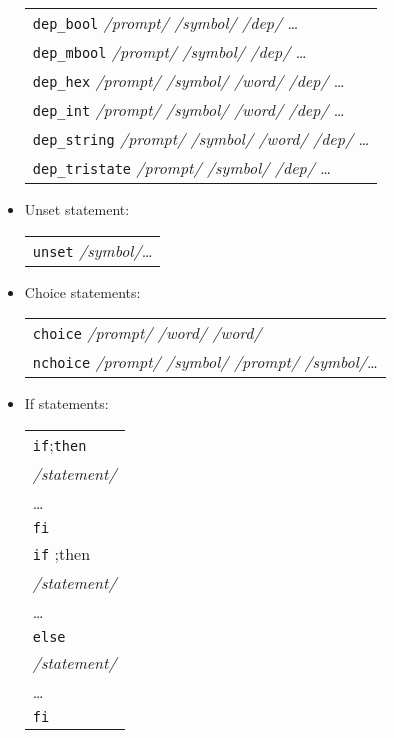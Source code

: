 \begin{itemize}
\begin{tabular}{l}
 \texttt{dep\_bool}    \quad\textit{/prompt/} \quad\textit{/symbol/} \quad\textit{/dep/} \dots\\
 \texttt{dep\_mbool}   \quad\textit{/prompt/} \quad\textit{/symbol/} \quad\textit{/dep/} \dots\\
 \texttt{dep\_hex}     \quad\textit{/prompt/} \quad\textit{/symbol/} \quad\textit{/word/} \quad\textit{/dep/} \quad\dots\\
 \texttt{dep\_int}     \quad\textit{/prompt/} \quad\textit{/symbol/} \quad\textit{/word/} \quad\textit{/dep/} \quad\dots\\
 \texttt{dep\_string}  \quad\textit{/prompt/} \quad\textit{/symbol/} \quad\textit{/word/} \quad\textit{/dep/} \quad\dots\\
 \texttt{dep\_tristate} \quad\textit{/prompt/} \quad\textit{/symbol/} \quad\textit{/dep/} \quad\dots\\
\end{tabular}

\item Unset statement:

\begin{tabular}{l}
 \texttt{unset} \quad\textit{/symbol/}\quad\dots\\
\end{tabular}

\item  Choice statements:

\begin{tabular}{l}
  \texttt{choice}          \quad\textit{/prompt/} \quad\textit{/word/} \quad\textit{/word/}\\
  \texttt{nchoice}         \quad\textit{/prompt/} \quad\textit{/symbol/} \quad\textit{/prompt/} \quad\textit{/symbol/}\quad\dots\\
\end{tabular}

\item If statements:

\begin{tabular}{l}
 \texttt{if} \quad;\quad \texttt{then}\\
          \qquad\textit{/statement/}\\
          \qquad\dots\\
        \texttt{fi}\\

 \texttt{if}  \quad;\quad then\\
          \qquad\textit{/statement/}\\
          \qquad\dots\\
        \texttt{else}\\
          \qquad\textit{/statement/}\\
          \qquad\dots\\
        \texttt{fi}\\
\end{tabular}


\end{itemize}
